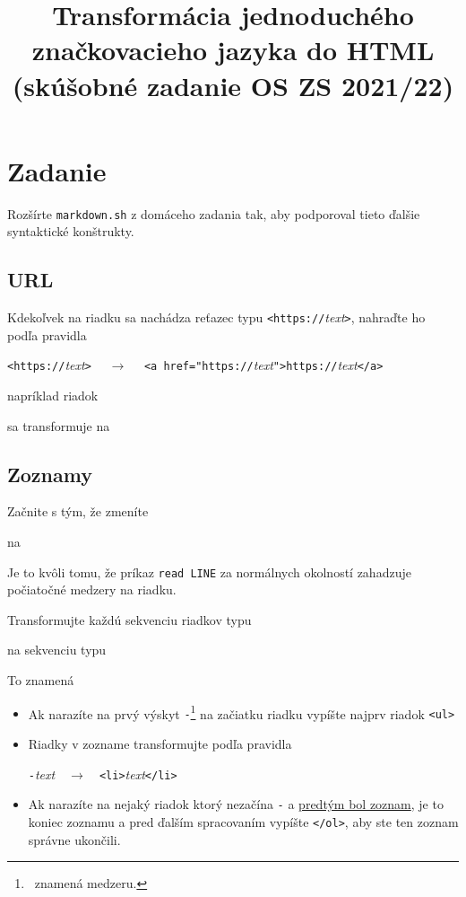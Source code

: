 \documentclass{article}
\newcommand{\codefile}[1]{\begin{framed}\end{framed}}
\newcommand{\tvs}{\textvisiblespace}
\begin{document}
\title{Transformácia jednoduchého značkovacieho jazyka do HTML\\
(skúšobné zadanie OS ZS 2021/22)}
\maketitle

\section{Zadanie}

Rozšírte {\tt markdown.sh} z domáceho zadania tak, aby podporoval tieto
ďalšie syntaktické konštrukty.

\subsection{URL}
Kdekoľvek na riadku sa nachádza reťazec typu {\tt <https://}{\em text}{\tt>},
nahraďte ho podľa pravidla
\begin{center}
{\tt <https://}{\em text}{\tt>}
$\quad\to\quad$
{\tt <a href="https://}{\em text}{\tt ">https://}{\em text}{\tt </a>}
\end{center}
napríklad riadok
\codefile{url.md}
sa transformuje na
\codefile{url.html}

\subsection{Zoznamy}

Začnite s tým, že zmeníte 
\codefile{whileold.sh}
na
\codefile{whilenew.sh}
Je to kvôli tomu, že príkaz {\tt read LINE} za normálnych okolností
zahadzuje počiatočné medzery na riadku.

Transformujte každú sekvenciu riadkov typu
\codefile{list.md}
na sekvenciu typu
\codefile{list.html}
To znamená
\begin{itemize}
\item Ak narazíte na prvý výskyt {\tt \tvs-\tvs}\footnote{\tvs ~znamená medzeru.} na začiatku riadku vypíšte najprv
riadok {\tt <ul>} 
\item
Riadky v zozname transformujte podľa pravidla
\begin{center}
{\tt\tvs-\tvs}{\em text}$\quad\to\quad${\tt <li>}{\em text}{\tt </li>} 
\end{center}
\item Ak narazíte na nejaký riadok ktorý nezačína {\tt \tvs-\tvs} a
\underline{predtým bol zoznam}, je to koniec zoznamu a pred ďalším spracovaním
vypíšte {\tt </ol>}, aby ste ten zoznam správne ukončili.
\end{itemize}
\end{document}
